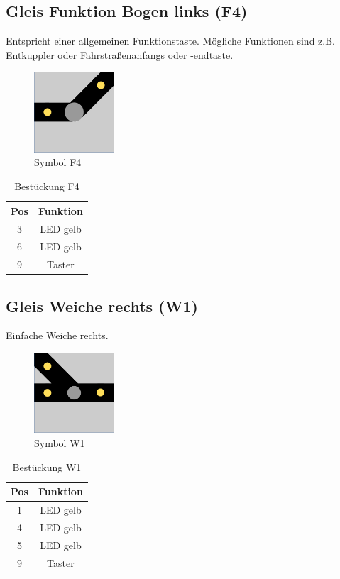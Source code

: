 \documentclass[10pt,a4paper]{article}
\begin{document}
\subsection{Gleis Funktion Bogen links (F4)}
Entspricht einer allgemeinen Funktionstaste. Mögliche Funktionen sind z.B. Entkuppler oder Fahrstraßenanfangs oder -endtaste.
\begin{figure}[hbtp]
\centering
\includegraphics[width=3cm]{../folien/f4.png}
\caption{Symbol F4}
\end{figure}
\begin{table}[h!]
\centering
\begin{tabular}{c|c}
\textbf{Pos} & \textbf{Funktion} \\ \hline
3 & LED gelb \\
6 & LED gelb \\
9 & Taster
\end{tabular}
\caption{Bestückung F4}
\end{table}

\newpage
\subsection{Gleis Weiche rechts (W1)}
Einfache Weiche rechts.
\begin{figure}[hbtp]
\centering
\includegraphics[width=3cm]{../folien/w1.png}
\caption{Symbol W1}
\end{figure}
\begin{table}[h!]
\centering
\begin{tabular}{c|c}
\textbf{Pos} & \textbf{Funktion} \\ \hline
1 & LED gelb \\
4 & LED gelb \\
5 & LED gelb \\
9 & Taster
\end{tabular}
\caption{Bestückung W1}
\end{table}
\end{document}
